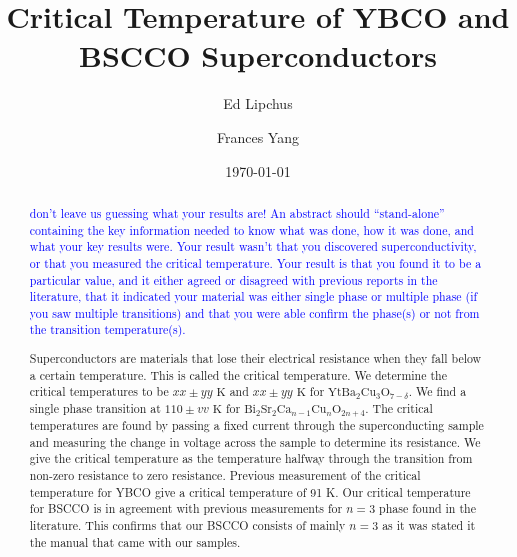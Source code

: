 \documentclass[prb,preprint]{revtex4-1}
\begin{document}

\title{Critical Temperature of YBCO and BSCCO Superconductors}

\author{Ed Lipchus}



\author{Frances Yang}


\date{\today}

\begin{abstract}

\textcolor{blue}{don't leave us guessing what your results are! An abstract should ``stand-alone'' containing the key information needed to know what was done, how it was done, and what your key results were. Your result wasn't that you discovered superconductivity, or that you measured the critical temperature. Your result is that you found it to be a particular value, and it either agreed or disagreed with previous reports in the literature, that it indicated your material was either single phase or multiple phase (if you saw multiple transitions) and that you were able confirm the phase(s) or not from the transition temperature(s).} 

Superconductors are materials that lose their electrical resistance  when they fall below a certain temperature. This is called the critical temperature. We determine the critical temperatures to be $xx \pm yy \text{ K}$ and $xx \pm yy \text{ K}$ for $\text{Yt}\text{Ba}_{2}\text{Cu}_{3}\text{O}_{7-\delta}$.
We find a single phase transition at $110\pm vv \text{ K}$ for $\text{Bi}_{2}\text{Sr}_{2}\text{Ca}_{n-1}\text{Cu}_{n}\text{O}_{2n+4}$.
The critical temperatures are found by passing a fixed current through the superconducting sample and measuring the change in voltage across the sample to determine its resistance. 
We give the critical temperature as the temperature halfway through the transition from non-zero resistance to zero resistance. Previous measurement of the critical temperature for YBCO give a critical temperature of 91 K. Our critical temperature for BSCCO is in agreement with previous measurements for $n=3$ phase found in the literature.    
This confirms that our BSCCO consists of mainly $n=3$ as it was stated it the manual that came with our samples.


\end{abstract}
\end{document}
